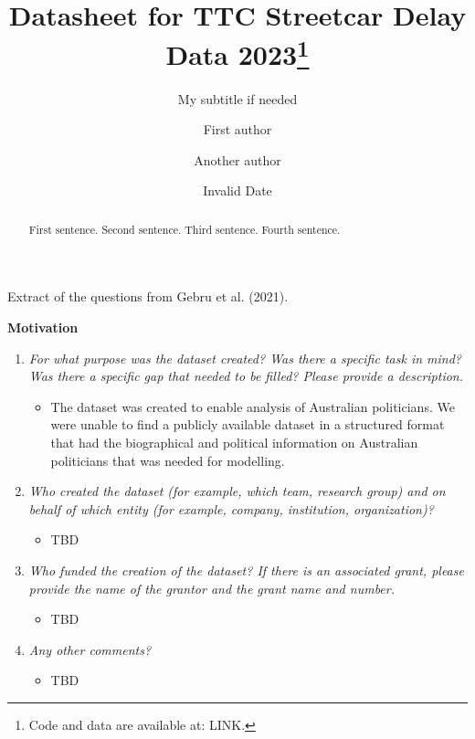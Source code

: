\documentclass[
  letterpaper,
  DIV=11,
  numbers=noendperiod]{scrartcl}
\title{Datasheet for TTC Streetcar Delay Data 2023\thanks{Code and data
are available at: LINK.}}
\subtitle{My subtitle if needed}
\author{First author \and Another author}
\date{Invalid Date}
\providecommand{\tightlist}{%
  \setlength{\itemsep}{0pt}\setlength{\parskip}{0pt}}\usepackage{longtable,booktabs,array}
\begin{document}
\maketitle
\begin{abstract}
First sentence. Second sentence. Third sentence. Fourth sentence.
\end{abstract}

Extract of the questions from Gebru et al. (2021).

\textbf{Motivation}

\begin{enumerate}
\def\labelenumi{\arabic{enumi}.}
\tightlist
\item
  \emph{For what purpose was the dataset created? Was there a specific
  task in mind? Was there a specific gap that needed to be filled?
  Please provide a description.}

  \begin{itemize}
  \tightlist
  \item
    The dataset was created to enable analysis of Australian
    politicians. We were unable to find a publicly available dataset in
    a structured format that had the biographical and political
    information on Australian politicians that was needed for modelling.
  \end{itemize}
\item
  \emph{Who created the dataset (for example, which team, research
  group) and on behalf of which entity (for example, company,
  institution, organization)?}

  \begin{itemize}
  \tightlist
  \item
    TBD
  \end{itemize}
\item
  \emph{Who funded the creation of the dataset? If there is an
  associated grant, please provide the name of the grantor and the grant
  name and number.}

  \begin{itemize}
  \tightlist
  \item
    TBD
  \end{itemize}
\item
  \emph{Any other comments?}

  \begin{itemize}
  \tightlist
  \item
    TBD
  \end{itemize}
\end{enumerate}
\end{document}

